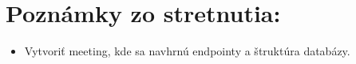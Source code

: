 \documentclass{article}
\begin{document}
    \section*{Poznámky zo stretnutia:}

    \begin{itemize}
        \item Vytvoriť meeting, kde sa navhrnú endpointy a štruktúra databázy.  
    \end{itemize}    
\end{document}
